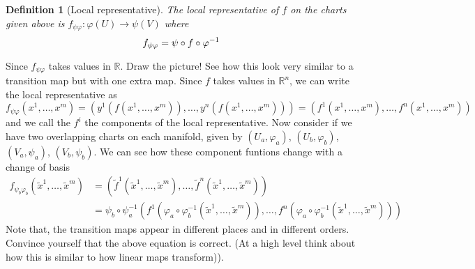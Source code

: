 \documentclass[a4paper]{article}
\newtheorem*{defn}{Definition}
\begin{document}
\begin{defn}[Local representative]
  The local representative of $f$ on the charts given above is $f_{\psi \varphi}: \varphi(U) \rightarrow  \psi(V)$ where
  \[
      f_{\psi \varphi} = \psi \circ f \circ \varphi^{-1} \\
  \]
\end{defn}
Since $f_{\psi \varphi}$ takes values in $\mathds{R}$. Draw the picture! See how this look very similar to a transition map but with one extra map. Since $f$ takes values in $\mathds{R}^n$, we can write the local representative as
\[
  f_{\psi \varphi}(x^1, \dots, x^m) = (y^1(f(x^1, \dots, x^m)), \dots, y^n(f(x^1, \dots, x^m))) = (f^1(x^1, \dots, x^m), \dots, f^n(x^1, \dots, x^m))
\]
and we call the $f^i$ the components of the local representative. Now consider if we have two overlapping charts on each manifold, given by $(U_a, \varphi_a)$, $(U_b, \varphi_b)$, $(V_a, \psi_a)$, $(V_b, \psi_b)$. We can see how these component funtions change with a change of basis
\[
  \begin{aligned}
    f_{\psi_b \varphi_b}(\tilde{x}^1, \dots, \tilde{x}^m) &= (\tilde{f}^1(\tilde{x}^1, \dots, \tilde{x}^m), \dots, \tilde{f}^n(\tilde{x}^1, \dots, \tilde{x}^m)) \\
                                                          &= \psi_b \circ \psi_a^{-1} (f^1(\varphi_a \circ \varphi_b^{-1} (\tilde{x}^1, \dots, \tilde{x}^m)), \dots, f^n(\varphi_a \circ \varphi_b^{-1} (\tilde{x}^1, \dots, \tilde{x}^m)))
  \end{aligned}
\]
Note that, the transition maps appear in different places and in different orders. Convince yourself that the above equation is correct. (At a high level think about how this is similar to how linear maps transform)).
\end{document}
